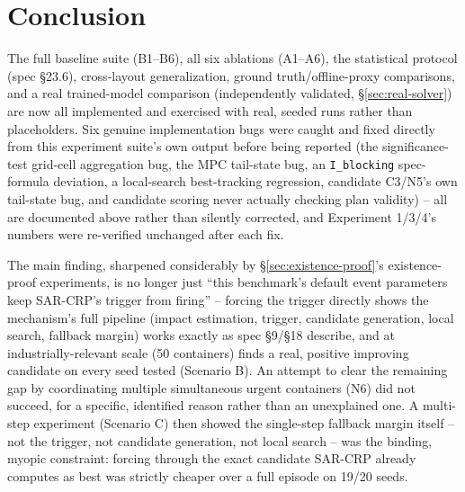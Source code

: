 \documentclass[11pt]{article}
\begin{document}
\section{Conclusion}

The full baseline suite (B1--B6), all six ablations (A1--A6), the
statistical protocol (spec \S23.6), cross-layout generalization, ground
truth/offline-proxy comparisons, and a real trained-model comparison
(independently validated, \S\ref{sec:real-solver}) are now all implemented
and exercised with real, seeded runs rather than placeholders. Six genuine
implementation bugs were caught and fixed directly from this experiment
suite's own output before being reported (the significance-test grid-cell
aggregation bug, the MPC tail-state bug, an \texttt{I\_blocking}
spec-formula deviation, a local-search best-tracking regression, candidate
C3/N5's own tail-state bug, and candidate scoring never actually checking
plan validity) -- all are documented above rather than silently corrected,
and Experiment 1/3/4's numbers were re-verified unchanged after each fix.

The main finding, sharpened considerably by \S\ref{sec:existence-proof}'s
existence-proof experiments, is no longer just ``this benchmark's default
event parameters keep SAR-CRP's trigger from firing'' -- forcing the
trigger directly shows the mechanism's full pipeline (impact estimation,
trigger, candidate generation, local search, fallback margin) works
exactly as spec \S9/\S18 describe, and at industrially-relevant scale (50
containers) finds a real, positive improving candidate on every seed
tested (Scenario B). An attempt to clear the remaining gap by coordinating
multiple simultaneous urgent containers (N6) did not succeed, for a
specific, identified reason rather than an unexplained one. A multi-step
experiment (Scenario C) then showed the single-step fallback margin
itself -- not the trigger, not candidate generation, not local search --
was the binding, myopic constraint: forcing through the exact candidate
SAR-CRP already computes as best was strictly cheaper over a full episode
on 19/20 seeds.
\end{document}
